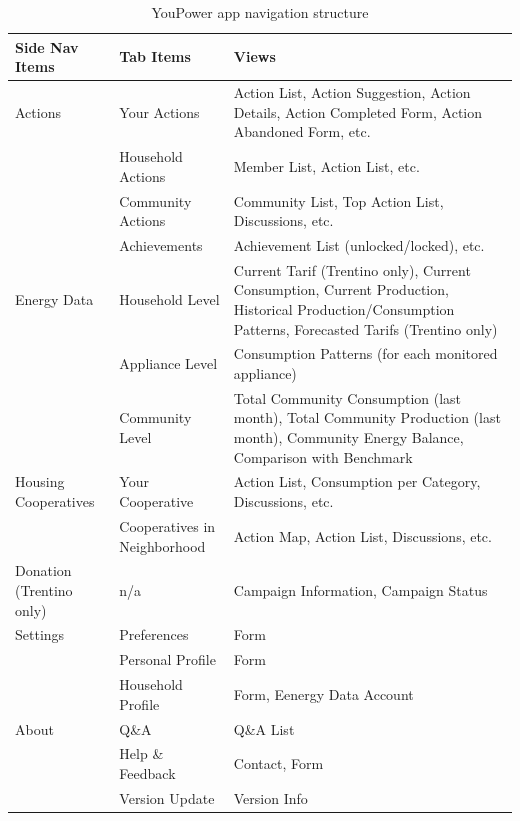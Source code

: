 \begin{table}
\caption{YouPower app navigation structure}\label{tab:app_nav}
\begin{center} \footnotesize 
\begin{tabular}{ l l p{6cm}}
\hline
\textbf{Side Nav Items}  &
\textbf{Tab Items}  &
\textbf{Views}  \\ \hline

Actions & Your Actions & Action List, Action Suggestion, Action Details, Action Completed Form, Action Abandoned Form, etc.\\ 
& Household Actions & Member List, Action List, etc. \\ 
& Community Actions & Community List, Top Action List, Discussions, etc.\\ 
& Achievements & Achievement List (unlocked/locked), etc.\\  \hline

Energy Data  & Household Level  & Current Tarif (Trentino only), Current Consumption, Current Production, Historical Production/Consumption Patterns, Forecasted Tarifs (Trentino only)\\ 
& Appliance Level & Consumption Patterns (for each monitored appliance) \\ 
&  Community Level & Total Community Consumption (last month), Total Community Production (last month), Community Energy Balance, Comparison with Benchmark \\  \hline

Housing Cooperatives & Your Cooperative & Action List, Consumption per Category, Discussions, etc. \\ 
& Cooperatives in Neighborhood&  Action Map, Action List, Discussions, etc. \\  \hline

Donation (Trentino only) & n/a & Campaign Information, Campaign Status \\
\hline

Settings & Preferences & Form \\ 
& Personal Profile & Form \\ 
& Household Profile & Form, Eenergy Data Account \\  \hline

About & Q\&A & Q\&A List \\ 
& Help \& Feedback & Contact, Form\\ 
& Version Update & Version Info\\  \hline
\end{tabular}
\end{center} 
\end{table}

